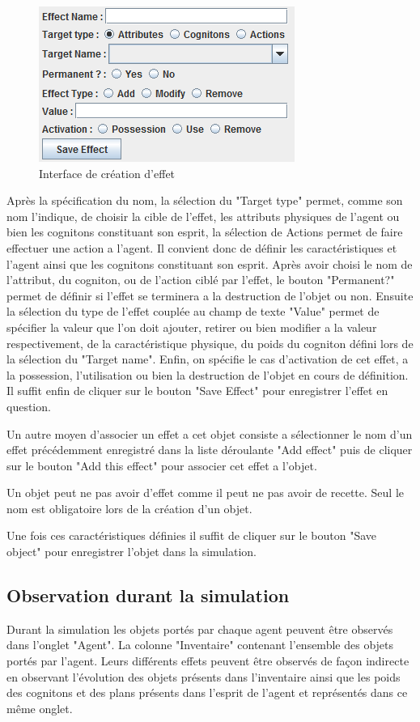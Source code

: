 \begin{figure}[!h]
\begin{center}
\includegraphics[scale = 1.0]{images/effets.png}
\caption[eff]{Interface de création d'effet \\}
\label{Interface de création d'effet}
\end{center}
\end{figure}

Après la spécification du nom, la sélection du "Target type" permet, comme son nom l'indique, de choisir la cible de l'effet, les attributs physiques de l'agent ou bien les cognitons constituant son esprit, la sélection de Actions permet de faire effectuer une action a l'agent. Il convient donc de définir les caractéristiques et l'agent ainsi que les cognitons constituant son esprit. Après avoir choisi le nom de l'attribut, du cogniton, ou de l'action ciblé par l'effet, le bouton "Permanent?" permet de définir si l'effet se terminera a la destruction de l'objet ou non. Ensuite la sélection du type de l'effet couplée au champ de texte "Value" permet de spécifier la valeur que l'on doit ajouter, retirer ou bien modifier a la valeur respectivement, de la caractéristique physique, du poids du cogniton défini lors de la sélection du "Target name". Enfin, on spécifie le cas d'activation de cet effet, a la possession, l'utilisation ou bien la destruction de l'objet en cours de définition. Il suffit enfin de cliquer sur le bouton "Save Effect" pour enregistrer l'effet en question.

Un autre moyen d'associer un effet a cet objet consiste a sélectionner le nom d'un effet précédemment enregistré dans la liste déroulante "Add effect" puis de cliquer sur le bouton "Add this effect" pour associer cet effet a l'objet.

Un objet peut ne pas avoir d'effet comme il peut ne pas avoir de recette. Seul le nom est obligatoire lors de la création d'un objet.

Une fois ces caractéristiques définies il suffit de cliquer sur le bouton "Save object" pour enregistrer l'objet dans la simulation.

\subsection{Observation durant la simulation}

Durant la simulation les objets portés par chaque agent peuvent être observés dans l'onglet "Agent". La colonne "Inventaire" contenant l'ensemble des objets portés par l'agent. Leurs différents effets peuvent être observés de façon indirecte en observant l'évolution des objets présents dans l'inventaire ainsi que les poids des cognitons et des plans présents dans l'esprit de l'agent et représentés dans ce même onglet.
